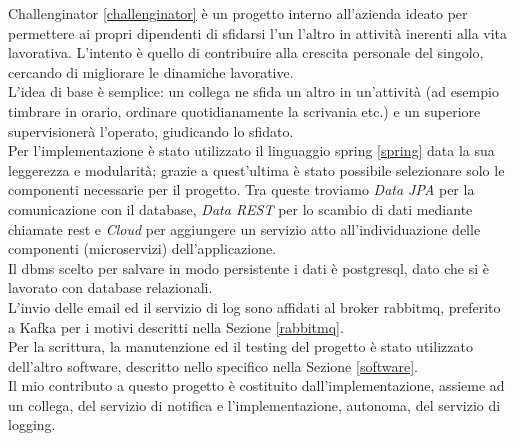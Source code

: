 Challenginator \ref{challenginator} è un progetto interno all'azienda ideato per permettere ai propri dipendenti di sfidarsi l'un l'altro in attività inerenti alla vita lavorativa. L'intento è quello di contribuire alla crescita personale del singolo, cercando di migliorare le dinamiche lavorative.\\
L'idea di base è semplice: un collega ne sfida un altro in un'attività (ad esempio timbrare in orario, ordinare quotidianamente la scrivania etc.) e un superiore supervisionerà l'operato, giudicando lo sfidato.\\
Per l'implementazione è stato utilizzato il linguaggio \Gls{spring} \ref{spring} data la sua leggerezza e modularità; grazie a quest'ultima è stato possibile selezionare solo le componenti necessarie per il progetto. Tra queste troviamo \textit{Data JPA} per la comunicazione con il database, \textit{Data REST} per lo scambio di dati mediante chiamate \acrshort{rest} e \textit{Cloud} per aggiungere un servizio atto all'individuazione delle componenti (microservizi) dell'applicazione.\\ Il \Gls{dbms} scelto per salvare in modo persistente i dati è \Gls{postgresql}, dato che si è lavorato con database relazionali.\\ L'invio delle email ed il servizio di log sono affidati al broker \Gls{rabbitmq}, preferito a Kafka per i motivi descritti nella Sezione \ref{rabbitmq}.\\ Per la scrittura, la manutenzione ed il testing del progetto è stato utilizzato dell'altro software, descritto nello specifico nella Sezione \ref{software}.\\
Il mio contributo a questo progetto è costituito dall'implementazione, assieme ad un collega, del servizio di notifica e l'implementazione, autonoma, del servizio di logging.